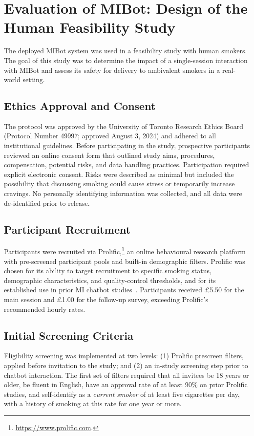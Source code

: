 \chapter{Evaluation of MIBot: Design of the Human Feasibility Study}
\label{ch:feasibility}
The deployed MIBot system was used in a feasibility study with human smokers. The goal of this study was to determine the impact of a single-session interaction with MIBot and assess its safety for delivery to ambivalent smokers in a real-world setting.

\section{Ethics Approval and Consent}
The protocol was approved by the University of Toronto Research Ethics Board (Protocol Number 49997; approved August 3, 2024) and adhered to all institutional guidelines. Before participating in the study, prospective participants reviewed an online consent form that outlined study aims, procedures, compensation, potential risks, and data handling practices. Participation required explicit electronic consent. Risks were described as minimal but included the possibility that discussing smoking could cause stress or temporarily increase cravings. No personally identifying information was collected, and all data were de-identified prior to release.

\section{Participant Recruitment}
\label{sec:recruitment}
Participants were recruited via Prolific,\footnote{\url{https://www.prolific.com}.} an online behavioural research platform with pre-screened participant pools and built-in demographic filters. Prolific was chosen for its ability to target recruitment to specific smoking status, demographic characteristics, and quality-control thresholds, and for its established use in prior MI chatbot studies~\citep{brown2023mi,info:doi/10.2196/20251}. Participants received \pounds5.50 for the main session and \pounds1.00 for the follow-up survey, exceeding Prolific's recommended hourly rates.


\section{Initial Screening Criteria}
Eligibility screening was implemented at two levels: (1) Prolific prescreen filters, applied before invitation to the study; and (2) an in-study screening step prior to chatbot interaction. The first set of filters required that all invitees be 18 years or older, be fluent in English, have an approval rate of at least 90\% on prior Prolific studies, and self-identify as a \emph{current smoker} of at least five cigarettes per day, with a history of smoking at this rate for one year or more.

